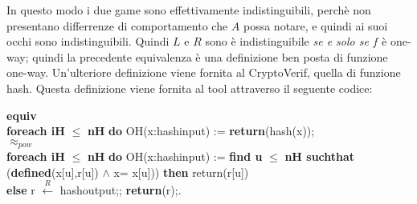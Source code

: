 \documentclass[a4paper,openright,twoside,12pt]{report}
\newcommand{\foreach}[2]{\textbf{foreach #1} $\leq$ \textbf{#2} \textbf{do}}
\newcommand{\return}[1]{\textbf{return}(#1);}
\newcommand{\setR}[2]{#1 $\xleftarrow{R}$ #2;}
\newcommand{\find}[6]{\textbf{find #1} $\leq$ \textbf{#2 suchthat} (\textbf{defined}(#3) $\wedge$ #4)) \textbf{then} #5 \\ \textbf{else} #6}
\newcommand{\equiva}{\textbf{equiv}}
\begin{document}
In questo modo i due game sono effettivamente indistinguibili, perch\`e non presentano differrenze di comportamento che $A$ possa notare, e quindi ai suoi occhi sono indistinguibili.
Quindi $L$ e $R$ sono \`e indistinguibile \emph{se e solo se} $f$ \`e one-way; quindi la precedente equivalenza \`e una definizione ben posta di funzione one-way.
Un'ulteriore definizione viene fornita al CryptoVerif, quella di funzione hash. Questa definizione viene fornita al tool attraverso il seguente codice:

 \equiva \\ 
  \foreach{iH}{nH} OH(x:hashinput) := \return{hash(x)}\\
    \textbf{$\approx _{pow}$}\\  
     \foreach{iH}{nH} OH(x:hashinput) :=
   \find{u}{nH}{x[u],r[u]}{x= x[u]}{return(r[u])}{\setR{r}{hashoutput}; \return{r}.}
 
\end{document}
